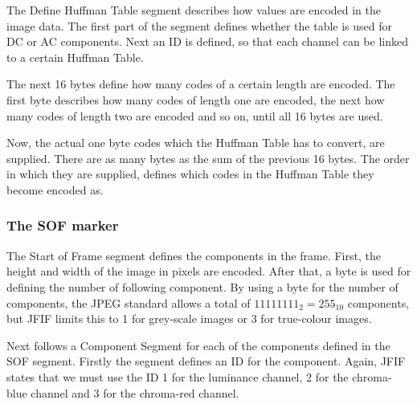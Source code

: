 \begin{infobox}
The Define Huffman Table segment describes how values are encoded in the image data. 
The first part of the segment defines whether the table is used for DC or AC components. Next an ID is defined, so that each channel can be linked to a certain Huffman Table.

The next 16 bytes define how many codes of a certain length are encoded. 
The first byte describes how many codes of length one are encoded, the next how many codes of length two are encoded and so on, until all 16 bytes are used. 

Now, the actual one byte codes which the Huffman Table has to convert, are supplied.
There are as many bytes as the sum of the previous 16 bytes. 
The order in which they are supplied, defines which codes in the Huffman Table they become encoded as.

\subsubsection{The SOF marker}
\begin{centering}
\end{centering}

The Start of Frame segment defines the components in the frame. 
First, the height and width of the image in pixels are encoded. 
After that, a byte is used for defining the number of following component.
By using a byte for the number of components, the JPEG standard allows a total of $11111111_2=255_{10}$ components, but JFIF limits this to 1 for grey-scale images or 3 for true-colour images.

Next follows a Component Segment for each of the components defined in the SOF segment.
Firstly the segment defines an ID for the component.
Again, JFIF states that we must use the ID 1 for the luminance channel, 2 for the chroma-blue channel and 3 for the chroma-red channel.


\end{infobox}
